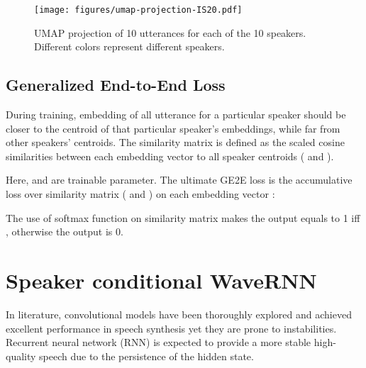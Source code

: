 \documentclass[a4paper]{article}
\begin{document}
\begin{figure}[h!]
  \begin{center}
  \vspace{-2mm}
    \texttt{[image: figures/umap-projection-IS20.pdf]}
  \end{center}
  \vspace{-6mm}
  \caption{\small UMAP projection of 10 utterances for each of the 10 speakers. Different colors represent different speakers.}
  \vspace{-6mm}
  \label{umap}
\end{figure}

\subsection{Generalized End-to-End Loss}
During training, embedding of all utterance for a particular speaker should be closer to the centroid of that particular speaker’s embeddings, while far from other speakers’ centroids. The similarity matrix  is defined as the scaled cosine similarities between each embedding vector  to all speaker centroids  ( and ).
\vspace{-2mm}



Here,  and  are trainable parameter. The ultimate GE2E loss  is the accumulative loss over similarity matrix ( and ) on each embedding vector :
\vspace{-4mm}

The use of softmax function on similarity matrix makes the output equals to 1 iff , otherwise the output is 0.


\vspace{-2mm}
\section{Speaker conditional WaveRNN}

In literature, convolutional models have been thoroughly explored and achieved excellent performance in speech synthesis \cite{oord2016wavenet, ping2018clarinet} yet they are prone to instabilities. Recurrent neural network (RNN) is expected to provide a more stable high-quality speech due to the persistence of the hidden state.
\vspace{-2mm}
\end{document}
